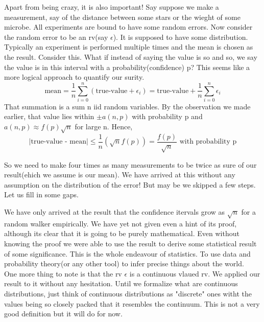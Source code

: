 \documentclass{myclass}
\begin{document}
Apart from being crazy, it is also important! Say suppose we make a measurement, say of the distance between some stars or the wieght of some microbe. All experiments are bound to have some random errors.
Now consider the random error to be an rv(say $\epsilon$). It is supposed to have some distribution. Typically an experiment is performed multiple times and the mean is chosen as the result. Consider this. What if instead of
saying the value is so and so, we say the value is in this interval with a probability(confidence) p? This seems like a more logical approach to quantify our surity.
$$\text{mean}=\frac{1}{n}\sum_{i=0}^{n}(\text{true-value}+\epsilon_i)=\text{true-value}+\frac{1}{n}\sum_{i=0}^n\epsilon_i$$
That summation is a sum n iid random variables. By the observation we made earlier, that value lies within $\pm a(n,p)$ with probability p and $a(n,p)\approx f(p)\sqrt{n}$ for large n. Hence,
$$|\text{true-value - mean}|\leq \frac{1}{n}(\sqrt{n}f(p))=\frac{f(p)}{\sqrt{n}} \text{ with probability p}$$

So we need to make four times as many measurements to be twice as sure of our result(ehich we assume is our mean). We have arrived at this without any assumption on the distribution of the error!
But may be we skipped a few steps. Let us fill in some gaps.
\begin{remarks}
    We have only arrived at the result that the confidence itervals grow as $\sqrt{n}$ for a random walker empirically. We have yet not given even a hint of its proof, although its clear that it is going to be purely mathematical.
    Even without knowing the proof we were able to use the result to derive some statistical result of some significance. This is the whole endeavour of statistics. To use data and probability theory(or any other tool) to infer precise things about the world.
    \\
    One more thing to note is that the rv $\epsilon$ is a continuous vlaued rv. We applied our result to it without any hesitation. Until we formalize what are continuous distributions, just think of continuous distributions as "discrete" ones
    witht the values being so closely packed that it resembles the continuum. This is not a very good definition but it will do for now.
\end{remarks}
\end{document}
